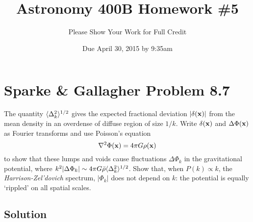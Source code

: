 \documentclass[]{article}
\title{Astronomy 400B Homework \#5}
\author{Please Show Your Work for Full Credit}
\date{Due April 30, 2015 by 9:35am}
\begin{document}
\maketitle

\section{Sparke \& Gallagher Problem 8.7}

The quantity $\langle\Delta_k^2\rangle^{1/2}$ gives the expected fractional deviation
$|\delta(\mathbf{x})|$ from the mean density in an overdense of diffuse region of
size $1/k$.  Write $\delta(\mathbf{x})$ and $\Delta \Phi(\mathbf{x})$ as Fourier transforms and
use Poisson's equation
\begin{equation}
\nabla^2 \Phi(\mathbf{x}) = 4\pi G \rho(\mathbf{x})
\end{equation}
\noindent
to show that these lumps and voids cause fluctuations $\Delta\Phi_k$ in the
gravitational potential, where $k^2|\Delta\Phi_k|\sim4\pi G\bar{\rho}\langle\Delta_k^2\rangle^{1/2}$.
Show that, when $P(k)\propto k$, the {\it Harrison-Zel'dovich} spectrum, $|\Phi_k|$ does
not depend on $k$: the potential is equally `rippled' on all spatial scales.

\subsection{Solution}
\end{document}
